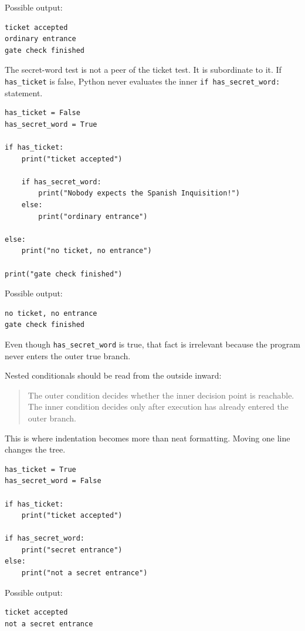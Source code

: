\documentclass[a4paper,twoside]{report}
\begin{document}
Possible output:

\begin{verbatim}
ticket accepted
ordinary entrance
gate check finished
\end{verbatim}

The secret-word test is not a peer of the ticket test. It is subordinate to it. If \texttt{has\_ticket} is false, Python never evaluates the inner \texttt{if has\_secret\_word:} statement.

\begin{verbatim}
has_ticket = False
has_secret_word = True

if has_ticket:
    print("ticket accepted")

    if has_secret_word:
        print("Nobody expects the Spanish Inquisition!")
    else:
        print("ordinary entrance")

else:
    print("no ticket, no entrance")

print("gate check finished")
\end{verbatim}

Possible output:

\begin{verbatim}
no ticket, no entrance
gate check finished
\end{verbatim}

Even though \texttt{has\_secret\_word} is true, that fact is irrelevant because the program never enters the outer true branch.

Nested conditionals should be read from the outside inward:

\begin{quote}
The outer condition decides whether the inner decision point is reachable. The inner condition decides only after execution has already entered the outer branch.
\end{quote}

This is where indentation becomes more than neat formatting. Moving one line changes the tree.

\begin{verbatim}
has_ticket = True
has_secret_word = False

if has_ticket:
    print("ticket accepted")

if has_secret_word:
    print("secret entrance")
else:
    print("not a secret entrance")
\end{verbatim}

Possible output:

\begin{verbatim}
ticket accepted
not a secret entrance
\end{verbatim}
\end{document}
